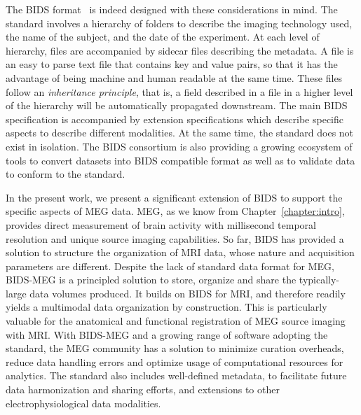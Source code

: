The \ac{BIDS} format~\citep{gorgolewski2016brain} is indeed designed with these considerations in mind. 
The standard involves a hierarchy of folders to describe the imaging technology used, the name of the subject, and the date of the experiment. 
At each level of hierarchy, files are accompanied by sidecar  files describing the metadata. 
A  file is an easy to parse text file that contains key and value pairs, so that it has the advantage of being machine and human readable at the same time. 
These files follow an \emph{inheritance principle}, that is, a field described in a  file in a higher level of the hierarchy will be automatically propagated downstream. 
The main BIDS specification is accompanied by extension specifications which describe specific aspects to describe different modalities.
At the same time, the standard does not exist in isolation.
The \ac{BIDS} consortium is also providing a growing ecosystem of tools to convert datasets into \ac{BIDS} compatible format as well as to validate data to conform to the standard. 

In the present work, we present a significant extension of \ac{BIDS} to support the specific aspects of \ac{MEG} data. \Ac{MEG}, as we know from Chapter~\ref{chapter:intro}, provides direct measurement of brain activity with millisecond temporal resolution and unique source imaging capabilities. So far, \ac{BIDS} has provided a solution to structure the organization of \ac{MRI} data, whose nature and acquisition parameters are different. Despite the lack of standard data format for \ac{MEG}, BIDS-MEG is a principled solution to store, organize and share the typically-large data volumes produced. It builds on \ac{BIDS} for \ac{MRI}, and therefore readily yields a multimodal data organization by construction. This is particularly valuable for the anatomical and functional registration of \ac{MEG} source imaging with \ac{MRI}. With BIDS-MEG and a growing range of software adopting the standard, the \ac{MEG} community has a solution to minimize curation overheads, reduce data handling errors and optimize usage of computational resources for analytics. The standard also includes well-defined metadata, to facilitate future data harmonization and sharing efforts, and extensions to other electrophysiological data modalities. 

\noindent{}%

